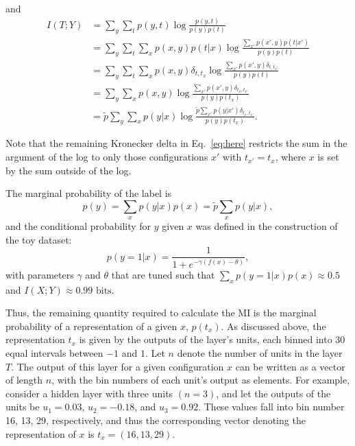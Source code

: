 \documentclass[12pt]{report}
\begin{document}
and
\begin{align}
I(T;Y) &= \sum \limits_{y} \sum \limits_{t} p(y,t) \log\frac{p(y,t)}{p(y)p(t)}\\
&= \sum \limits_{y} \sum \limits_{t} \sum \limits_{x} p(x,y) p(t|x) \log\frac{ \sum \limits_{x'} p(x',y) p(t|x') }{p(y)p(t)}\\
&= \sum \limits_{y} \sum \limits_{t} \sum \limits_{x} p(x,y) \delta_{t,t_x} \log\frac{ \sum \limits_{x'} p(x',y) \delta_{t,t_{x'}} }{p(y)p(t)}\\
&= \sum \limits_{y} \sum \limits_{x} p(x,y) \log\frac{ \sum \limits_{x'} p(x',y) \delta_{t_x,t_{x'}} }{p(y)p(t_x)}\\
&= \tilde{p} \sum \limits_{y} \sum \limits_{x} p(y|x) \log\frac{ \tilde{p} \sum \limits_{x'} p(y|x') \delta_{t_x,t_{x'}} }{p(y)p(t_x)}. \label{eq:here}
\end{align}

Note that the remaining Kronecker delta in Eq.~\eqref{eq:here} restricts the sum in the argument of the log to only those configurations $x'$ with $t_{x'}=t_x$, where $x$ is set by the sum outside of the log.


The marginal probability of the label is
\begin{equation}
p(y) = \sum\limits_x p(y|x)p(x) = \tilde{p} \sum\limits_x p(y|x),
\end{equation}
and the conditional probability for $y$ given $x$ was defined in the construction of the toy dataset:
\begin{equation}
p(y=1|x) = \frac{1}{1+e^{-\gamma (f(x)-\theta)}},
\end{equation}
with parameters $\gamma$ and $\theta$ that are tuned such that $\sum_x p(y=1|x) p(x) \approx 0.5$ and $I(X;Y) \approx 0.99 \text{ bits}$.

Thus, the remaining quantity required to calculate the MI is the marginal probability of a representation of a given $x$, $p(t_x)$. As discussed above, the representation $t_x$ is given by the outputs of the layer's units, each binned into 30 equal intervals between $-1$ and $1$. Let $n$ denote the number of units in the layer $T$. The output of this layer for a given configuration $x$ can be written as a vector of length $n$, with the bin numbers of each unit's output as elements. For example, consider a hidden layer with three units $(n=3)$, and let the outputs of the units be $u_1=0.03$, $u_2=-0.18$, and $u_3=0.92$. These values fall into bin number 16, 13, 29, respectively, and thus the corresponding vector denoting the representation of $x$ is $t_x=(16,13,29)$.
\end{document}
